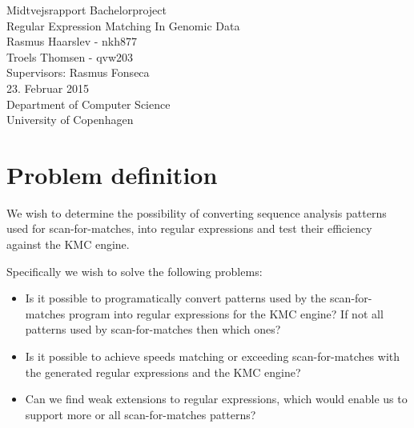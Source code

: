 \documentclass[12pt]{article}
\begin{document}
\begin{titlepage}
    \vspace*{\fill}
    \begin{center}
      {\Huge Midtvejsrapport Bachelorproject}\\[0.7cm]
      {\Large Regular Expression Matching In Genomic Data}\\[0.4cm]
      {\large Rasmus Haarslev - nkh877}\\
      {\large Troels Thomsen - qvw203}\\[0.4cm]
      {Supervisors: Rasmus Fonseca}\\
      {\small 23. Februar 2015}\\[0.3cm] 
      {\small Department of Computer Science}\\
      {\small University of Copenhagen}
    \end{center}
    \vspace*{\fill}
\end{titlepage}	

\clearpage
{}
\thispagestyle{empty}

\newpage

\tableofcontents
\newpage


\section{Problem definition}

We wish to determine the possibility of converting sequence analysis patterns used for scan-for-matches\cite{scan-for-matches}, into regular expressions\cite{crash-course-regex} and test their efficiency against the KMC\cite{kmc-website} engine.

Specifically we wish to solve the following problems:

\begin{itemize}
	\item Is it possible to programatically convert patterns used by the scan-for-matches program into regular expressions for the KMC engine? If not all patterns used by scan-for-matches then which ones?
	\item Is it possible to achieve speeds matching or exceeding scan-for-matches with the generated regular expressions and the KMC engine?
	\item Can we find weak extensions to regular expressions, which would enable us to support more or all scan-for-matches patterns?
\end{itemize}
\end{document}
